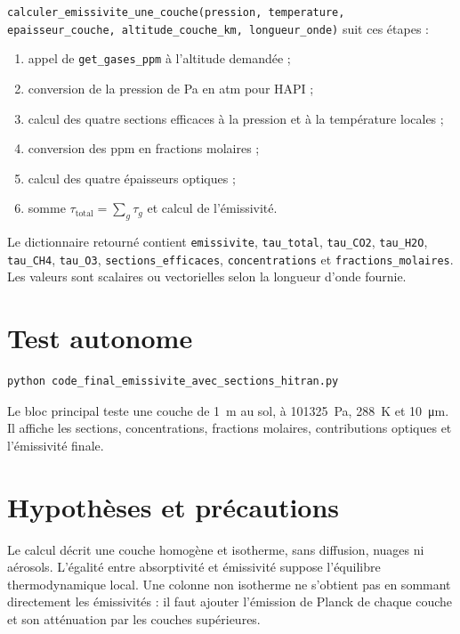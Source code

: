 \documentclass[11pt,a4paper]{article}
\begin{document}
\texttt{calculer\_emissivite\_une\_couche(pression, temperature,
epaisseur\_couche, altitude\_couche\_km, longueur\_onde)} suit ces étapes :

\begin{enumerate}
  \item appel de \texttt{get\_gases\_ppm} à l'altitude demandée ;
  \item conversion de la pression de Pa en atm pour HAPI ;
  \item calcul des quatre sections efficaces à la pression et à la
        température locales ;
  \item conversion des ppm en fractions molaires ;
  \item calcul des quatre épaisseurs optiques ;
  \item somme $\tau_{\mathrm{total}}=\sum_g\tau_g$ et calcul de l'émissivité.
\end{enumerate}

Le dictionnaire retourné contient \texttt{emissivite}, \texttt{tau\_total},
\texttt{tau\_CO2}, \texttt{tau\_H2O}, \texttt{tau\_CH4}, \texttt{tau\_O3},
\texttt{sections\_efficaces}, \texttt{concentrations} et
\texttt{fractions\_molaires}. Les valeurs sont scalaires ou vectorielles selon
la longueur d'onde fournie.

\section{Test autonome}

\begin{lstlisting}[language=bash]
python code_final_emissivite_avec_sections_hitran.py
\end{lstlisting}

Le bloc principal teste une couche de \SI{1}{\metre} au sol, à
\SI{101325}{\pascal}, \SI{288}{\kelvin} et \SI{10}{\micro\metre}. Il affiche
les sections, concentrations, fractions molaires, contributions optiques et
l'émissivité finale.

\section{Hypothèses et précautions}

Le calcul décrit une couche homogène et isotherme, sans diffusion, nuages ni
aérosols. L'égalité entre absorptivité et émissivité suppose l'équilibre
thermodynamique local. Une colonne non isotherme ne s'obtient pas en sommant
directement les émissivités : il faut ajouter l'émission de Planck de chaque
couche et son atténuation par les couches supérieures.
\end{document}

